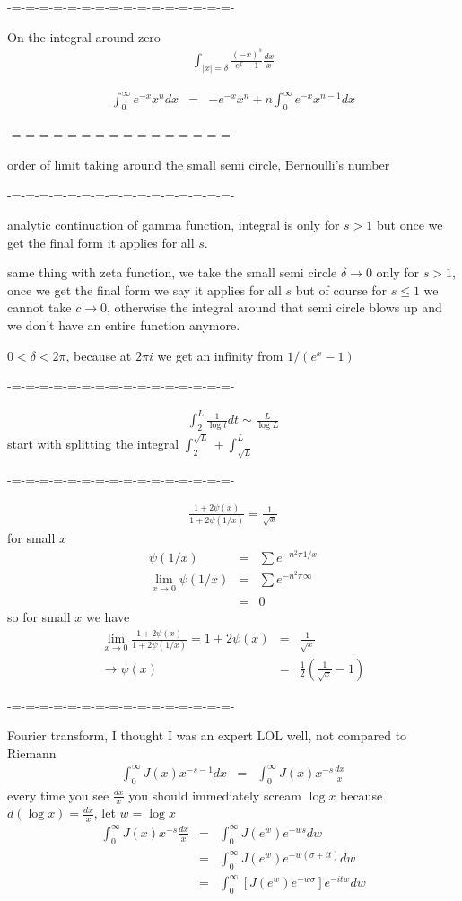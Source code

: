 \documentclass[aps,preprint,preprintnumbers,nofootinbib,showpacs,prd]{revtex4-1}
\newcommand{\nbea}{\begin{eqnarray*}}
\newcommand{\neea}{\end{eqnarray*}}
\begin{document}
-=-=-=-=-=-=-=-=-=-=-=-=-=-=-=-=-

On the integral around zero
%
\nbea
\int_{|x| = \delta} \frac{(-x)^s}{e^x-1} \frac{dx}{x}
\neea
%


%
\nbea
\int_0^\infty e^{-x}x^n dx & = & -e^{-x}x^{n} + n\int_0^\infty e^{-x}x^{n-1} dx
\neea
%

-=-=-=-=-=-=-=-=-=-=-=-=-=-=-=-=-

order of limit taking around the small semi circle, Bernoulli's number

-=-=-=-=-=-=-=-=-=-=-=-=-=-=-=-=-

analytic continuation of gamma function, integral is only for $s > 1$ but once we get the final form it applies for all $s$.

same thing with zeta function, we take the small semi circle $\delta \to 0$ only for $s > 1$, once we get the final form we say it applies for all $s$ but of course for $s \le 1$ we cannot take $c\to0$, otherwise the integral around that semi circle blows up and we don't have an entire function anymore.

$0 < \delta < 2\pi$, because at $2\pi i$ we get an infinity from $1/(e^x-1)$

-=-=-=-=-=-=-=-=-=-=-=-=-=-=-=-=-

%
\nbea
\int_2^L \frac{1}{\log t}dt \sim \frac{L}{\log L}
\neea
%
start with splitting the integral $\int_2^{\sqrt{L}} + \int_{\sqrt{L}}^{L}$

-=-=-=-=-=-=-=-=-=-=-=-=-=-=-=-=-

%
\nbea
\frac{1 + 2\psi(x)}{1 + 2\psi(1/x)} = \frac{1}{\sqrt{x}}
\neea
%
for small $x$
%
\nbea
\psi(1/x) & = & \sum e^{-n^2 \pi 1/x} \\
\lim_{x\to 0} \psi(1/x) & = & \sum e^{-n^2 \pi \infty} \\
& = & 0
\neea
%
so for small $x$ we have
%
\nbea
\lim_{x\to 0} \frac{1 + 2\psi(x)}{1 + 2\psi(1/x)} = 1 + 2\psi(x) & = & \frac{1}{\sqrt{x}} \\
\to \psi(x) & = & \frac{1}{2} \left( \frac{1}{\sqrt{x}} - 1\right)
\neea
%

-=-=-=-=-=-=-=-=-=-=-=-=-=-=-=-=-

Fourier transform, I thought I was an expert LOL well, not compared to Riemann
%
\nbea
\int_0^\infty J(x) x^{-s-1} dx & = & \int_0^\infty J(x) x^{-s} \frac{dx}{x}
\neea
%
every time you see $\frac{dx}{x}$ you should immediately scream $\log x$ because $d(\log x) = \frac{dx}{x}$, let $w = \log x$
%
\nbea
\int_0^\infty J(x) x^{-s} \frac{dx}{x} & = & \int_0^\infty J(e^w)e^{-ws} dw \\
& = & \int_0^\infty J(e^w)e^{-w(\sigma + it)} dw \\
& = & \int_0^\infty \left\lbrack J(e^w)e^{-w\sigma} \right\rbrack e^{-itw} dw
\neea
%
\end{document}
